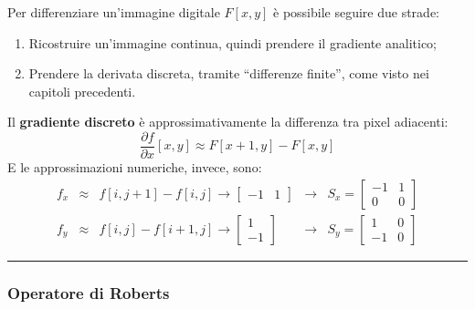 \documentclass[a4paper]{article}
\newcommand{\dquotes}[1]{``#1''}
\newcommand{\longline}{\noindent\rule{\textwidth}{0.4pt}}
\begin{document}
	Per differenziare un'immagine digitale $F\left[x,y\right]$ è possibile seguire due strade:
	\begin{enumerate}
		\item Ricostruire un'immagine continua, quindi prendere il gradiente analitico;
		\item Prendere la derivata discreta, tramite \dquotes{differenze finite}, come visto nei capitoli precedenti.
	\end{enumerate}
	Il \textbf{gradiente discreto} è approssimativamente la differenza tra pixel adiacenti:
	\begin{equation*}
		\dfrac{\partial f}{\partial x}\left[x,y\right] \approx F\left[x + 1, y\right] - F\left[x,y\right]
	\end{equation*}
	E le approssimazioni numeriche, invece, sono:
	\begin{equation*}
		\begin{array}{lllll}
			f_{x} & \approx & f\left[i, j+1\right] - f\left[i,j\right] \longrightarrow \begin{bmatrix}
				-1 & 1
			\end{bmatrix} & \longrightarrow & S_{x} = \begin{bmatrix}
			-1 & 1 \\
			0 & 0
		\end{bmatrix} \\
			f_{y} & \approx & f\left[i,j\right] - f\left[i+1, j\right] \longrightarrow \begin{bmatrix}
				1 \\
				-1
			\end{bmatrix} & \longrightarrow & S_{y} = \begin{bmatrix}
			1 & 0 \\
			-1 & 0
		\end{bmatrix}
		\end{array}
	\end{equation*}\label{gradiente discreto}

	\longline
	
	\subsubsection{Operatore di Roberts}
	
\end{document}
